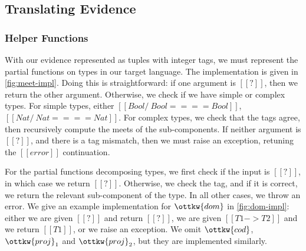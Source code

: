 \documentclass[11pt]{article}
\begin{document}
\subsection{Translating Evidence}

\subsubsection{Helper Functions}

With our evidence represented as tuples with integer tags, we must represent the partial functions
on types in our target language. 
The implementation is given in \autoref{fig:meet-impl}.
Doing this is straightforward: if one argument is $[[?]]$,
then we return the other argument. Otherwise, we check if we have simple or complex types.
For simple types, either $[[Bool /\ Bool ==== Bool]]$, $[[Nat /\ Nat ==== Nat]]$.
For complex types, we check that the tags agree, then recursively compute the meets of the sub-components.
If neither argument is $[[?]]$, and there is a tag mismatch, then we must raise an exception, retuning the $[[error]]$
continuation.

For the partial functions decomposing types, we first check if the input is $[[?]]$,
in which case we return $[[?]]$. Otherwise, we check the tag, and if it is correct, we return
the relevant sub-component of the type. In all other cases, we throw an error.
We give an example implementation for $\ottkw{dom}$ in \autoref{fig:dom-impl}: either we are given $[[?]]$
and return $[[?]]$, we are given $[[T1 -> T2]]$ and we return $[[T1]]$, or we raise an exception.
We omit $\ottkw{cod}$, $\ottkw{proj}_1$ and $\ottkw{proj}_2$, but they are implemented similarly.
\end{document}
